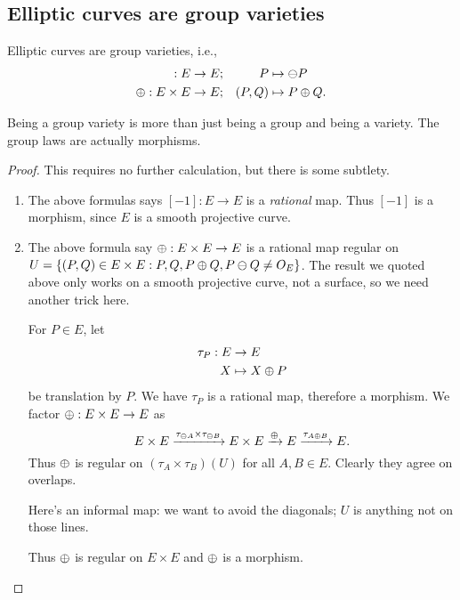 \subsection{Elliptic curves are group varieties}
\begin{thm}
Elliptic curves are group varieties, i.e.,
\begin{align*}
[-1]:E&\to E; & P&\mapsto \ominus P\\
\opl: E\times E&\to E;& (P,Q)&\mapsto P\opl Q. 
\end{align*}
\end{thm}
Being a group variety is more than just being a group and being a variety. The group laws are actually morphisms.
\begin{proof}
This requires no further calculation, but there is some subtlety.
\begin{enumerate}
\item The above formulas says $[-1]:E\to E$ is a {\it rational} map. Thus $[-1]$ is a morphism, since $E$ is a smooth projective curve.
\item The above formula say $\oplus:E\times E\to E$ is a rational map regular on $U=\left\{{(P,Q)\in E\times E}:{P,Q,P\oplus Q,P\ominus Q\ne O_E}\right\}$.
The result we quoted above only works on a smooth projective curve, not a surface, so we need another trick here.

For $P\in E$, let 
\begin{align*}
\tau_P:E&\to E\\
X&\mapsto X\oplus P
\end{align*}
be translation by $P$. We have $\tau_P$ is a rational map, therefore a morphism. We factor $\oplus:E \times E \to E$ as
\[
E\times E\xrightarrow{\tau_{\ominus A}\times \tau_{\ominus B}} E\times E \xrightarrow{\oplus} E\xrightarrow{\tau_{A\oplus B}} E.
\]
Thus $\oplus$ is regular on $(\tau_A\times \tau_B)(U)$ for all $A,B\in E$. Clearly they agree on overlaps.

Here's an informal map: we want to avoid the diagonals; $U$ is anything not on those lines. %

Thus $\oplus$ is regular on $E\times E$ and $\oplus$ is a morphism.
\end{enumerate}
\end{proof}

